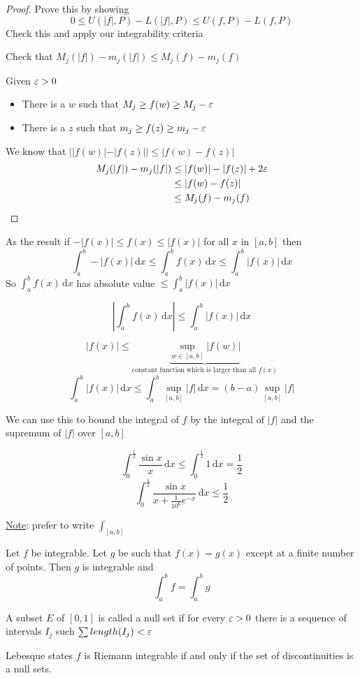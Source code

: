 \begin{proof}
  Prove this by showing
  \[0 \le U(|f|, P) - L(|f|, P) \le U(f, P) - L(f, P)\]
  Check this and apply our integrability criteria

  Check that $M_j(|f|) - m_j(|f|) \le M_j(f) - m_j(f)$

  Given $\varepsilon > 0$ 
  \begin{itemize}
    \item There is a $w$ such that $M_j \ge f(w) \ge M_j- \varepsilon$
    \item There is a $z$ such that $m_j \ge f(z) \ge m_j- \varepsilon$
  \end{itemize}
  We know that $||f(w)| - |f(z)|| \le |f(w) - f(z)|$
  \begin{align*}
  M_j(|f|) - m_j(|f|) &\le |f(w)| - |f(z)| + 2\varepsilon \\
  &\le |f(w) - f(z)| \\
  &\le M_j(f) - m_j(f) \\
  \end{align*}
\end{proof}

As the result if
$-|f(x)| \le f(x) \le |f(x)|$ for all $x$ in $[a, b]$ then 
\[\int_a^b -|f(x)| \,\mathrm{d}x \le \int_a^b f(x) \,\mathrm{d}x \le \int_a^b |f(x)| \,\mathrm{d}x\] 
So $\displaystyle\int_a^b f(x) \,\mathrm{d}x$ has absolute value $\displaystyle\le \int_a^b |f(x)| \,\mathrm{d}x$

\[\left|\int_a^b f(x) \,\mathrm{d}x\right|\le\int_a^b |f(x)|\,\mathrm{d}x\]

\[|f(x)| \le \underbrace{\sup_{w \in [a, b]} |f(w)|}_{\text{constant function which is larger than all }f(x)}\]
\[\int_a^b |f(x)| \,\mathrm{d}x \le \int_a^b \sup_{[a, b]}|f| \,\mathrm{d}x = (b-a) \sup_{[a, b]} |f| \]

We can use this to bound the integral of $f$ by the integral of $|f|$ and the supremum of $|f|$ over $[a, b]$

\begin{example*}
  \[\int_0^{\frac{1}{2}} \frac{\sin x}{x} \,\mathrm{d}x \le \int_0^{\frac{1}{2}} 1 \,\mathrm{d}x = \frac{1}{2} \]
  \[\int_0^{\frac{1}{2}} \frac{\sin x}{x + \frac{1}{10^6}e^{-x}} \,\mathrm{d}x \le \frac{1}{2} \]
\end{example*}

\underline{Note}: prefer to write $\displaystyle\int_{[a, b]}$

\begin{theorem*}[Exercise]
  Let $f$ be integrable. Let $g$ be such that $f(x) = g(x)$ except at a finite number of points. 
  Then $g$ is integrable and 
  \[\int_a^b f = \int_a^b g\]
\end{theorem*}

\begin{theorem*}[Lebesgue]
  A subset $E$ of $[0, 1]$ is called a null set if for every $\varepsilon > 0$ 
  there is a sequence  of intervals $I_j$ such $\sum length(I_j) < \varepsilon$

  Lebesque states $f$ is Riemann integrable if and only if the set of discontinuities is a null sets.
\end{theorem*}